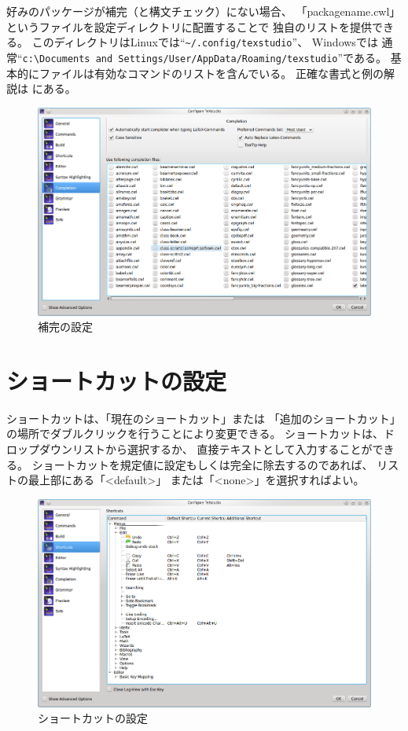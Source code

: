 好みのパッケージが補完（と構文チェック）にない場合、
「packagename.cwl」というファイルを設定ディレクトリに配置することで
独自のリストを提供できる。
このディレクトリはLinuxでは``\verb+~/.config/texstudio+''、
Windowsでは
通常``\verb+c:\Documents and Settings/User/AppData/Roaming/texstudio+''である。
基本的にファイルは有効なコマンドのリストを含んでいる。
正確な書式と例の解説は
にある。

\begin{figure}[H]
  \centering
  \includegraphics[width=.8\linewidth]{configure_completion.png}
  \caption{補完の設定}
\end{figure}

\section{ショートカットの設定}

ショートカットは、「現在のショートカット」または
「追加のショートカット」の場所でダブルクリックを行うことにより変更できる。
ショートカットは、ドロップダウンリストから選択するか、
直接テキストとして入力することができる。
ショートカットを規定値に設定もしくは完全に除去するのであれば、
リストの最上部にある「\textless{}default\textgreater{}」
または「\textless{}none\textgreater{}」を選択すればよい。

\begin{figure}[H]
  \centering
  \includegraphics[width=.8\linewidth]{configure_shortcuts.png}
  \caption{ショートカットの設定}
\end{figure}

